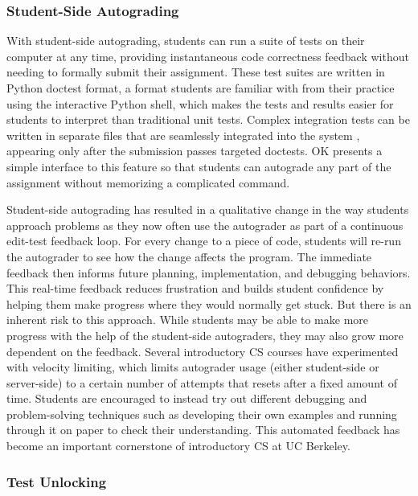 \subsubsection{Student-Side Autograding}

With student-side autograding, students can run a suite of tests on their computer at any time, providing instantaneous code correctness feedback without needing to formally submit their assignment. These test suites are written in Python doctest format, a format students are familiar with from their practice using the interactive Python shell, which makes the tests and results easier for students to interpret than traditional unit tests. Complex integration tests can be written in separate files that are seamlessly integrated into the system \cite{Sridhara:2016}, appearing only after the submission passes targeted doctests. OK presents a simple interface to this feature so that students can autograde any part of the assignment without memorizing a complicated command.

Student-side autograding has resulted in a qualitative change in the way students approach problems as they now often use the autograder as part of a continuous edit-test feedback loop. For every change to a piece of code, students will re-run the autograder to see how the change affects the program. The immediate feedback then informs future planning, implementation, and debugging behaviors. This real-time feedback reduces frustration and builds student confidence by helping them make progress where they would normally get stuck. But there is an inherent risk to this approach. While students may be able to make more progress with the help of the student-side autograders, they may also grow more dependent on the feedback. Several introductory CS courses have experimented with velocity limiting, which limits autograder usage (either student-side or server-side) to a certain number of attempts that resets after a fixed amount of time. Students are encouraged to instead try out different debugging and problem-solving techniques such as developing their own examples and running through it on paper to check their understanding. This automated feedback has become an important cornerstone of introductory CS at UC Berkeley.

\subsubsection{Test Unlocking}

